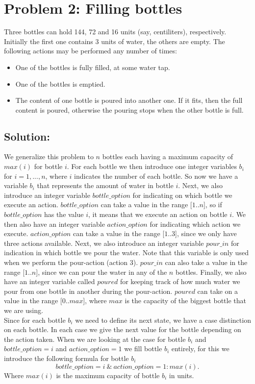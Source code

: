 \documentclass[a4paper]{article}
\begin{document}
	\section*{Problem 2: Filling bottles}
	Three bottles can hold 144, 72 and 16 units (say, centiliters), respectively. Initially the
first one contains 3 units of water, the others are empty. The following actions may be performed any number of times:
\begin{itemize}
\item One of the bottles is fully filled, at some water tap.
\item One of the bottles is emptied.
\item The content of one bottle is poured into another one. If it fits, then the full content
is poured, otherwise the pouring stops when the other bottle is full.
\end{itemize}

	\subsection*{Solution:}
	We generalize this problem to $n$ bottles each having a maximum capacity of $max(i)$ for bottle $i$. For each bottle we then introduce one integer variables $b_i$ for $i=1,...,n$, where $i$ indicates the number of each bottle. So now we have a variable $b_i$ that represents the amount of water in bottle $i$. Next, we also introduce an integer variable $bottle\_option$ for indicating on which bottle we execute an action. $bottle\_option$ can take a value in the range [$1..n$], so if $bottle\_option$ has the value $i$, it means that we execute an action on bottle $i$. We then also have an integer variable $action\_option$ for indicating which action we execute. $action\_option$ can take a value in the range [$1..3$], since we only have three actions available. Next, we also introduce an integer variable $pour\_in$ for indication in which bottle we pour the water. Note that this variable is only used when we perform the pour-action (action 3). $pour\_in$ can also take a value in the range [$1..n$], since we can pour the water in any of the $n$ bottles. Finally, we also have an integer variable called $poured$ for keeping track of how much water we pour from one bottle in another during the pour-action. $poured$ can take on a value in the range [$0..max$], where $max$ is the capacity of the biggest bottle that we are using.\\
	
	Since for each bottle $b_i$ we need to define its next state, we have a case distinction on each bottle. In each case we give the next value for the bottle depending on the action taken. When we are looking at the case for bottle $b_i$ and $bottle\_option = i$ and $action\_option = 1$ we fill bottle $b_i$ entirely, for this we introduce the following formula for bottle $b_i$
\[ bottle\_option = i\ \&\ action\_option = 1 : max(i).\]
Where $max(i)$ is the maximum capacity of bottle $b_i$ in units.\\
\end{document}

